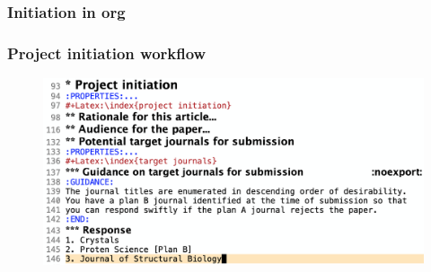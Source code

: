 \documentclass[aspectratio=169]{beamer}
\begin{document}
\subsubsection{Initiation in org}
\begin{frame}
\frametitle{Project initiation workflow}
\begin{center}
            \begin{figure}
                \includegraphics[scale=0.235]{Figures/targetJournals0573.png}
            \end{figure}
\end{center}
\end{frame}





\end{document}
